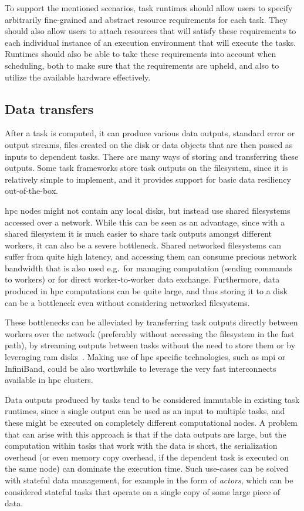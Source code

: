 To support the mentioned scenarios, task runtimes should allow users to specify arbitrarily
fine-grained and abstract resource requirements for each task. They should also allow users to
attach resources that will satisfy these requirements to each individual instance of an execution
environment that will execute the tasks. Runtimes should also be able to take these requirements
into account when scheduling, both to make sure that the requirements are upheld, and also to
utilize the available hardware effectively.

\subsection{Data transfers}
After a task is computed, it can produce various data outputs, standard error or output streams,
files created on the disk or data objects that are then passed as inputs to dependent tasks. There
are many ways of storing and transferring these outputs. Some task frameworks store task outputs on
the filesystem, since it is relatively simple to implement, and it provides support for basic data
resiliency out-of-the-box.

\gls{hpc} nodes might not contain any local disks, but instead use shared
filesystems accessed over a network. While this can be seen as an advantage, since with a shared
filesystem it is much easier to share task outputs amongst different workers, it can also be a
severe bottleneck. Shared networked filesystems can suffer from quite high latency, and accessing
them can consume precious network bandwidth that is also used e.g.\ for managing computation
(sending commands to workers) or for direct worker-to-worker data exchange. Furthermore, data
produced in \gls{hpc} computations can be quite large, and thus storing it to a
disk can be a bottleneck even without considering networked filesystems.

These bottlenecks can be alleviated by transferring task outputs directly between workers over the
network (preferably without accessing the filesystem in the fast path), by streaming outputs
between tasks without the need to store them or by leveraging \gls{ram}
disks~\cite{hyperloom}. Making use of \gls{hpc} specific technologies,
such as \gls{mpi} or InfiniBand, could be also worthwhile to leverage the very
fast interconnects available in \gls{hpc} clusters.

Data outputs produced by tasks tend to be considered immutable in existing task runtimes, since a
single output can be used as an input to multiple tasks, and these might be executed on completely
different computational nodes. A problem that can arise with this approach is that if the data
outputs are large, but the computation within tasks that work with the data is short, the
serialization overhead (or even memory copy overhead, if the dependent task is executed on the same
node) can dominate the execution time. Such use-cases can be solved with stateful data management,
for example in the form of \emph{actors}, which can be considered stateful tasks that
operate on a single copy of some large piece of data.

